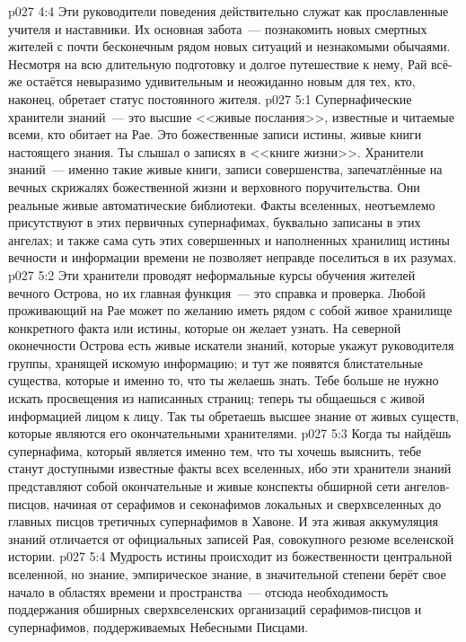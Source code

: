 \vs p027 4:4 Эти руководители поведения действительно служат как прославленные учителя и наставники. Их основная забота~--- познакомить новых смертных жителей с почти бесконечным рядом новых ситуаций и незнакомыми обычаями. Несмотря на всю длительную подготовку и долгое путешествие к нему, Рай всё\hyp{}же остаётся невыразимо удивительным и неожиданно новым для тех, кто, наконец, обретает статус постоянного жителя.
\vs p027 5:1 Супернафические хранители знаний~--- это высшие <<живые послания>>, известные и читаемые всеми, кто обитает на Рае. Это божественные записи истины, живые книги настоящего знания. Ты слышал о записях в <<книге жизни>>. Хранители знаний~--- именно такие живые книги, записи совершенства, запечатлённые на вечных скрижалях божественной жизни и верховного поручительства. Они реальные живые автоматические библиотеки. Факты вселенных, неотъемлемо присутствуют в этих первичных супернафимах, буквально записаны в этих ангелах; и также сама суть этих совершенных и наполненных хранилищ истины вечности и информации времени не позволяет неправде поселиться в их разумах.
\vs p027 5:2 Эти хранители проводят неформальные курсы обучения жителей вечного Острова, но их главная функция~--- это справка и проверка. Любой проживающий на Рае может по желанию иметь рядом с собой живое хранилище конкретного факта или истины, которые он желает узнать. На северной оконечности Острова есть живые искатели знаний, которые укажут руководителя группы, хранящей искомую информацию; и тут же появятся блистательные существа, которые и  именно то, что ты желаешь знать. Тебе больше не нужно искать просвещения из написанных страниц; теперь ты общаешься с живой информацией лицом к лицу. Так ты обретаешь высшее знание от живых существ, которые являются его окончательными хранителями.
\vs p027 5:3 Когда ты найдёшь супернафима, который является именно тем, что ты хочешь выяснить, тебе станут доступными  известные факты всех вселенных, ибо эти хранители знаний представляют собой окончательные и живые конспекты обширной сети ангелов\hyp{}писцов, начиная от серафимов и секонафимов локальных и сверхвселенных до главных писцов третичных супернафимов в Хавоне. И эта живая аккумуляция знаний отличается от официальных записей Рая, совокупного резюме вселенской истории.
\vs p027 5:4 Мудрость истины происходит из божественности центральной вселенной, но знание, эмпирическое знание, в значительной степени берёт свое начало в областях времени и пространства~--- отсюда необходимость поддержания обширных сверхвселенских организаций серафимов\hyp{}писцов и супернафимов, поддерживаемых Небесными Писцами.
